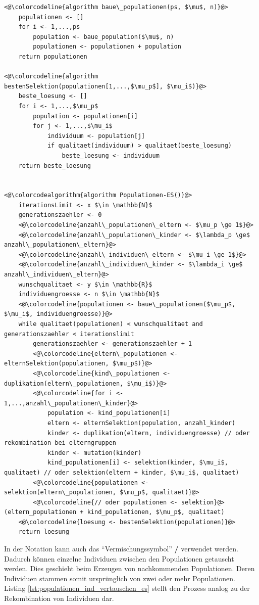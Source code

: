 \begin{lstlisting}[caption={Evolutionsstrategien mit mehreren Populationen}, firstnumber=1, captionpos=b, label=lst:populationen_es]
<@\colorcodeline{algorithm baue\_populationen(ps, $\mu$, n)}@>
	populationen <- []
	for i <- 1,...,ps
		population <- baue_population($\mu$, n)	
		populationen <- populationen + population
	return populationen
	
<@\colorcodeline{algorithm bestenSelektion(populationen[1,...,$\mu_p$], $\mu_i$)}@>
	beste_loesung <- []
	for i <- 1,...,$\mu_p$
		population <- populationen[i]
		for j <- 1,...,$\mu_i$
			individuum <- population[j]
			if qualitaet(individuum) > qualitaet(beste_loesung)
				beste_loesung <- individuum
	return beste_loesung
	

<@\colorcodealgorithm{algorithm Populationen-ES()}@>
	iterationsLimit <- x $\in \mathbb{N}$
	generationszaehler <- 0
	<@\colorcodeline{anzahl\_populationen\_eltern <- $\mu_p \ge 1$}@>
	<@\colorcodeline{anzahl\_populationen\_kinder <- $\lambda_p \ge$ anzahl\_populationen\_eltern}@>
	<@\colorcodeline{anzahl\_individuen\_eltern <- $\mu_i \ge 1$}@>
	<@\colorcodeline{anzahl\_individuen\_kinder <- $\lambda_i \ge$ anzahl\_individuen\_eltern}@>
	wunschqualitaet <- y $\in \mathbb{R}$
	individuengroesse <- n $\in \mathbb{N}$
	<@\colorcodeline{populationen <- baue\_populationen($\mu_p$, $\mu_i$, individuengroesse)}@>
	while qualitaet(populationen) < wunschqualitaet and generationszaehler < iterationslimit
		generationszaehler <- generationszaehler + 1
		<@\colorcodeline{eltern\_populationen <- elternSelektion(populationen, $\mu_p$)}@>
		<@\colorcodeline{kind\_populationen <- duplikation(eltern\_populationen, $\mu_i$)}@>
		<@\colorcodeline{for i <- 1,...,anzahl\_populationen\_kinder}@>
			population <- kind_populationen[i]
			eltern <- elternSelektion(population, anzahl_kinder)
			kinder <- duplikation(eltern, individuengroesse) // oder rekombination bei elterngruppen
			kinder <- mutation(kinder)
			kind_populationen[i] <- selektion(kinder, $\mu_i$, qualitaet) // oder selektion(eltern + kinder, $\mu_i$, qualitaet)
		<@\colorcodeline{populationen <- selektion(eltern\_populationen, $\mu_p$, qualitaet)}@>
		<@\colorcodeline{// oder populationen <- selektion}@>(eltern_populationen + kind_populationen, $\mu_p$, qualitaet)
	<@\colorcodeline{loesung <- bestenSelektion(populationen)}@>
	return loesung
\end{lstlisting}

In der Notation kann auch das \enquote{Vermischungssymbol} \textbf{/} verwendet werden. Dadurch können einzelne Individuen zwischen den Populationen getauscht werden. Dies geschieht beim Erzeugen von nachkommenden Populationen. Deren Individuen stammen somit ursprünglich von zwei oder mehr Populationen. Listing \ref{lst:populationen_ind_vertauschen_es} stellt den Prozess analog zu der Rekombination von Individuen dar.

